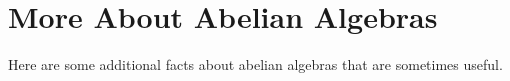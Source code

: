 



































































\appendix


\section{More About Abelian Algebras}
\label{sec:abelian-algebras}
Here are some additional facts about abelian algebras that are sometimes useful.


